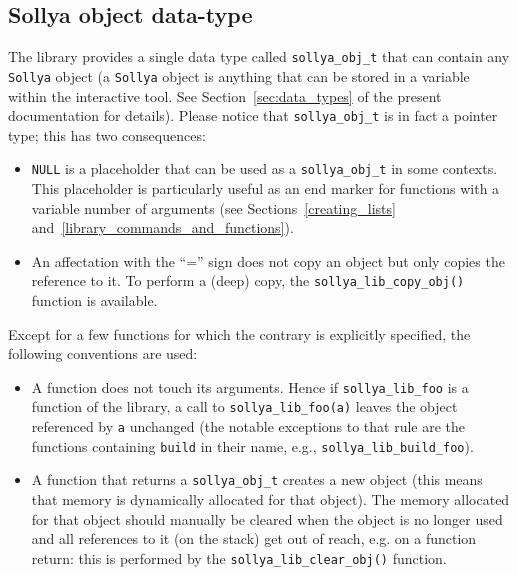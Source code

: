 \documentclass[a4paper]{article}
\newcommand{\sollya}{\texttt{Sollya}\xspace}
\begin{document}
 \subsection{Sollya object data-type}
The library provides a single data type called \texttt{sollya\_obj\_t} that can contain any \sollya object (a \sollya object is anything that can be stored in a variable within the interactive tool. See Section~\ref{sec:data_types} of the present documentation for details). Please notice that \texttt{sollya\_obj\_t} is in fact a pointer type; this has two consequences:
\begin{itemize}
\item \texttt{NULL} is a placeholder that can be used as a \texttt{sollya\_obj\_t} in some contexts. This placeholder is particularly useful as an end marker for functions with a variable number of arguments (see Sections~\ref{creating_lists} and~\ref{library_commands_and_functions}).
\item An affectation with the ``='' sign does not copy an object but only copies the reference to it. To perform a (deep) copy, the \texttt{sollya\_lib\_copy\_obj()} function is available.
\end{itemize}
Except for a few functions for which the contrary is explicitly specified, the following conventions are used:
\begin{itemize}
\item  A function does not touch its arguments. Hence if \texttt{sollya\_lib\_foo} is a function of the library, a call to \texttt{sollya\_lib\_foo(a)} leaves the object referenced by \texttt{a} unchanged (the notable exceptions to that rule are the functions containing \verb|build| in their name, e.g., \texttt{sollya\_lib\_build\_foo}).
\item A function that returns a \texttt{sollya\_obj\_t} creates a new object (this means that memory is dynamically allocated for that object). The memory allocated for that object should manually be cleared when the object is no longer used and all references to it (on the stack) get out of reach, e.g. on a function return: this is performed by the \texttt{sollya\_lib\_clear\_obj()} function.
\end{itemize}
\end{document}
